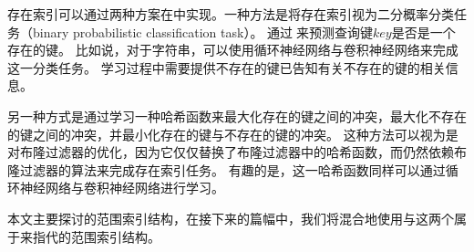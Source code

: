 
存在索引可以通过两种方案在{\li}中实现。一种方法是将存在索引视为二分概率分类任务（binary probabilistic classification task）。
通过{\model}来预测查询键$key$是否是一个存在的键。
比如说，对于字符串，{\li}可以使用循环神经网络与卷积神经网络来完成这一分类任务。
学习过程中需要提供不存在的键已告知{\model}有关不存在的键的相关信息。

另一种方式是通过学习一种哈希函数来最大化存在的键之间的冲突，最大化不存在的键之间的冲突，并最小化存在的键与不存在的键的冲突。
这种方法可以视为是对布隆过滤器的优化，因为它仅仅替换了布隆过滤器中的哈希函数，而仍然依赖布隆过滤器的算法来完成存在索引任务。
有趣的是，这一哈希函数同样可以通过循环神经网络与卷积神经网络进行学习。


本文主要探讨{\li}的范围索引结构，在接下来的篇幅中，我们将混合地使用{\li}与{\rmi}这两个属于来指代{\li}的范围索引结构。 
